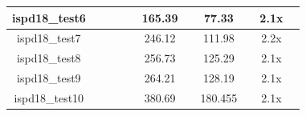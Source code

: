 \begin{table}[!htbp]
\begin{tabular}{|c|lllc|cccl|cl|}
    ispd18\_test6                   & \multicolumn{1}{l|}{}   & \multicolumn{1}{l|}{}   & \multicolumn{1}{l|}{}                                                   &                                                    & \multicolumn{1}{c|}{165.39} & \multicolumn{1}{c|}{}   & \multicolumn{1}{c|}{77.33}                                              &                                                                         & \multicolumn{1}{c|}{2.1x}                                               &                                                                         \\ \hline
    ispd18\_test7                   & \multicolumn{1}{l|}{}   & \multicolumn{1}{l|}{}   & \multicolumn{1}{l|}{}                                                   &                                                    & \multicolumn{1}{c|}{246.12} & \multicolumn{1}{c|}{}   & \multicolumn{1}{c|}{111.98}                                             &                                                                         & \multicolumn{1}{c|}{2.2x}                                               &                                                                         \\ \hline
    ispd18\_test8                   & \multicolumn{1}{l|}{}   & \multicolumn{1}{l|}{}   & \multicolumn{1}{l|}{}                                                   &                                                    & \multicolumn{1}{c|}{256.73} & \multicolumn{1}{c|}{}   & \multicolumn{1}{c|}{125.29}                                             &                                                                         & \multicolumn{1}{c|}{2.1x}                                               &                                                                         \\ \hline
    ispd18\_test9                   & \multicolumn{1}{l|}{}   & \multicolumn{1}{l|}{}   & \multicolumn{1}{l|}{}                                                   &                                                    & \multicolumn{1}{c|}{264.21} & \multicolumn{1}{c|}{}   & \multicolumn{1}{c|}{128.19}                                             &                                                                         & \multicolumn{1}{c|}{2.1x}                                               &                                                                         \\ \hline
    ispd18\_test10                  & \multicolumn{1}{l|}{}   & \multicolumn{1}{l|}{}   & \multicolumn{1}{l|}{}                                                   &                                                    & \multicolumn{1}{c|}{380.69} & \multicolumn{1}{c|}{}   & \multicolumn{1}{c|}{180.455}                                            &                                                                         & \multicolumn{1}{c|}{2.1x}                                               &                                                                         \\ \hline
    \end{tabular}
    \label{tab:performance between}  %
    \end{table}


